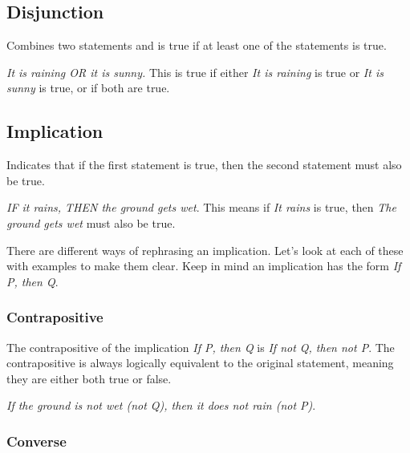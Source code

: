 \documentclass{article}
\theoremstyle{mytheoremstyle}
\theoremstyle{mytheoremstyle}
\theoremstyle{myexamplestyle}
\begin{document}
\subsection{Disjunction}

\begin{definition}
    Combines two statements and is true if at least one of the
    statements is true.
\end{definition}

\begin{example}
    \emph{It is raining OR it is sunny.} This is true if either
    \emph{It is raining} is true or \emph{It is sunny} is true, or
    if both are true.
\end{example}

\subsection{Implication}

\begin{definition}
    Indicates that if the first statement is true, then the second
    statement must also be true.
\end{definition}

\begin{example}
    \emph{IF it rains, THEN the ground gets wet}. This means if
    \emph{It rains} is true, then \emph{The ground gets wet} must
    also be true.
\end{example}

There are different ways of rephrasing an implication. Let's look at
each of these with examples to make them clear. Keep in mind an implication has the form \emph{If P, then Q}.

\subsubsection{Contrapositive}
\begin{definition}
    The contrapositive of the implication \emph{If P, then Q} is
    \emph{If not Q, then not P}. The contrapositive is always
    logically equivalent to the original statement, meaning they are
    either both true or false.
\end{definition}

\begin{example}
    \emph{If the ground is not wet (not Q), then it does not rain (not P)}.
\end{example}

\subsubsection{Converse}
\end{document}
